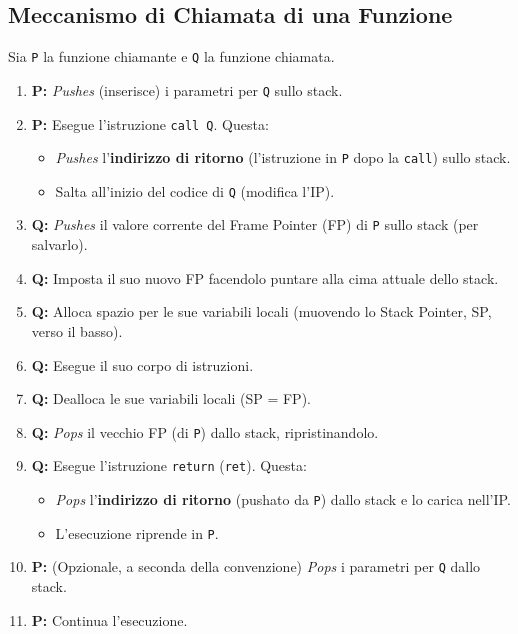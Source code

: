 \documentclass{article}
\begin{document}
\subsection{Meccanismo di Chiamata di una Funzione}
Sia \texttt{P} la funzione chiamante e \texttt{Q} la funzione chiamata.
\begin{enumerate}
    \item \textbf{P:} \textit{Pushes} (inserisce) i parametri per \texttt{Q} sullo stack.
    \item \textbf{P:} Esegue l'istruzione \texttt{call Q}. Questa:
        \begin{itemize}
            \item \textit{Pushes} l'\textbf{indirizzo di ritorno} (l'istruzione in \texttt{P} dopo la \texttt{call}) sullo stack.
            \item Salta all'inizio del codice di \texttt{Q} (modifica l'IP).
        \end{itemize}
    \item \textbf{Q:} \textit{Pushes} il valore corrente del Frame Pointer (FP) di \texttt{P} sullo stack (per salvarlo).
    \item \textbf{Q:} Imposta il suo nuovo FP facendolo puntare alla cima attuale dello stack.
    \item \textbf{Q:} Alloca spazio per le sue variabili locali (muovendo lo Stack Pointer, SP, verso il basso).
    \item \textbf{Q:} Esegue il suo corpo di istruzioni.
    \item \textbf{Q:} Dealloca le sue variabili locali (SP = FP).
    \item \textbf{Q:} \textit{Pops} il vecchio FP (di \texttt{P}) dallo stack, ripristinandolo.
    \item \textbf{Q:} Esegue l'istruzione \texttt{return} (\texttt{ret}). Questa:
        \begin{itemize}
            \item \textit{Pops} l'\textbf{indirizzo di ritorno} (pushato da \texttt{P}) dallo stack e lo carica nell'IP.
            \item L'esecuzione riprende in \texttt{P}.
        \end{itemize}
    \item \textbf{P:} (Opzionale, a seconda della convenzione) \textit{Pops} i parametri per \texttt{Q} dallo stack.
    \item \textbf{P:} Continua l'esecuzione.
\end{enumerate}
\end{document}
